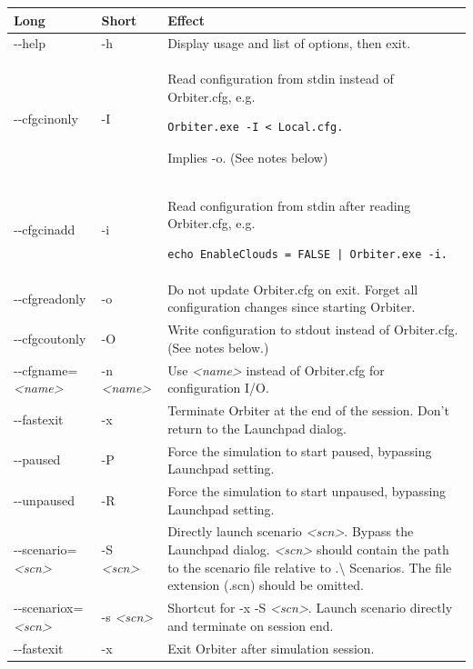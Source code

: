 \documentclass[Orbiter User Manual.tex]{subfiles}
\begin{document}
	\begin{longtable}{ p{} p{}
		>{\RaggedRight}p{} }
	\hline
	\textbf{Long} & \textbf{Short} & \textbf{Effect}\\
	\hline
	-{}-help & -h & Display usage and list of options, then exit.\\
	\hline
	-{}-cfgcinonly & -I & Read configuration from stdin instead of Orbiter.cfg,
		e.g.
\begin{lstlisting}[language=OSFS,aboveskip=2pt, belowskip=2pt]
Orbiter.exe -I < Local.cfg.
\end{lstlisting}
		Implies -o. (See notes below)\\
	\hline
	-{}-cfgcinadd & -i & Read configuration from stdin after reading
		Orbiter.cfg, e.g.
\begin{lstlisting}[language=OSFS,aboveskip=2pt, belowskip=2pt]
echo EnableClouds = FALSE | Orbiter.exe -i.
\end{lstlisting}\\
	\hline
	-{}-cfgreadonly & -o & Do not update Orbiter.cfg on exit. Forget all
		configuration changes since starting Orbiter.\\
	\hline
	-{}-cfgcoutonly & -O & Write configuration to stdout instead of Orbiter.cfg.
		(See notes below.)\\
	\hline
	-{}-cfgname=\textit{<name>} & -n \textit{<name>} & Use \textit{<name>}
		instead of Orbiter.cfg for configuration I/O.\\
	\hline
	-{}-fastexit & -x & Terminate Orbiter at the end of the session. Don't
		return to the Launchpad dialog.\\
	\hline
	-{}-paused & -P & Force the simulation to start paused, bypassing Launchpad
		setting.\\
	\hline
	-{}-unpaused & -R & Force the simulation to start unpaused, bypassing
		Launchpad setting.\\
	\hline
	-{}-scenario=\textit{<scn>} & -S \textit{<scn>} & Directly launch scenario
		\textit{<scn>}. Bypass the Launchpad dialog. \textit{<scn>} should
		contain the path to the scenario file relative to .\textbackslash
		Scenarios. The file extension (.scn) should be omitted.\\
	\hline
	-{}-scenariox=\textit{<scn>} & -s \textit{<scn>} & Shortcut for -x -S
		\textit{<scn>}. Launch scenario directly and terminate on session end.\\
	\hline
	-{}-fastexit & -x & Exit Orbiter after simulation session.\\

\end{longtable}
\end{document}
